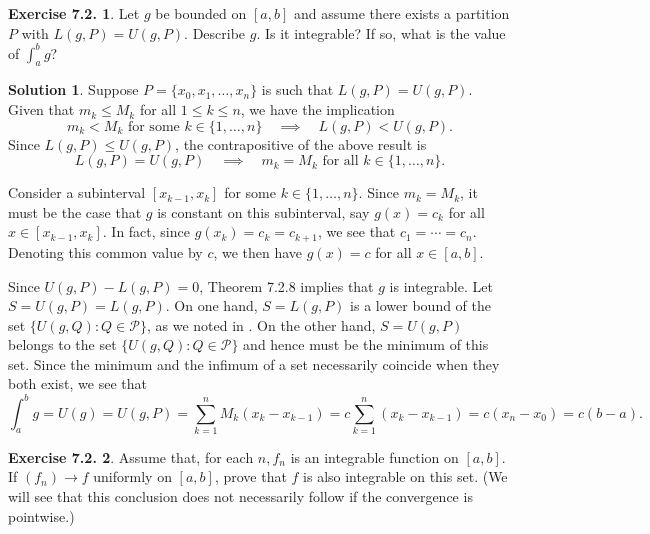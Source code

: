 \documentclass[12pt]{article}
\theoremstyle{definition}
\theoremstyle{exercise}
\newtheorem{exercise}{Exercise 7.2.}
\theoremstyle{solution}
\newtheorem*{solution}{Solution}
\newcommand{\poly}{\mathcal{P}}
\newcommand{\quimplies}{\quad \implies \quad}
\begin{document}
\begin{exercise}
\label{ex:4}
    Let \( g \) be bounded on \( [a, b] \) and assume there exists a partition \( P \) with \( L(g, P) = U(g, P) \). Describe \( g \). Is it integrable? If so, what is the value of \( \int_a^b g \)?
\end{exercise}

\begin{solution}
    Suppose \( P = \{ x_0, x_1, \ldots, x_n \} \) is such that \( L(g, P) = U(g, P) \). Given that \( m_k \leq M_k \) for all \( 1 \leq k \leq n \), we have the implication
    \[
        m_k < M_k \text{ for some } k \in \{ 1, \ldots, n \} \quimplies L(g, P) < U(g, P).
    \]
    Since \( L(g, P) \leq U(g, P) \), the contrapositive of the above result is
    \[
        L(g, P) = U(g, P) \quimplies m_k = M_k \text{ for all } k \in \{ 1, \ldots, n \}.
    \]

    Consider a subinterval \( [x_{k-1}, x_k] \) for some \( k \in \{ 1, \ldots, n \} \). Since \( m_k = M_k \), it must be the case that \( g \) is constant on this subinterval, say \( g(x) = c_k \) for all \( x \in [x_{k-1}, x_k] \). In fact, since \( g(x_k) = c_k = c_{k+1} \), we see that \( c_1 = \cdots = c_n \). Denoting this common value by \( c \), we then have \( g(x) = c \) for all \( x \in [a, b] \).
    
    Since \( U(g, P) - L(g, P) = 0 \), Theorem 7.2.8 implies that \( g \) is integrable. Let \( S = U(g, P) = L(g, P) \). On one hand, \( S = L(g, P) \) is a lower bound of the set \( \{ U(g, Q) : Q \in \poly \} \), as we noted in . On the other hand, \( S = U(g, P) \) belongs to the set \( \{ U(g, Q) : Q \in \poly \} \) and hence must be the minimum of this set. Since the minimum and the infimum of a set necessarily coincide when they both exist, we see that
    \[
        \int_a^b g = U(g) = U(g, P) = \sum_{k=1}^n M_k (x_k - x_{k-1}) = c \sum_{k=1}^n (x_k - x_{k-1}) = c (x_n - x_0) = c (b - a).
    \]
\end{solution}

\begin{exercise}
\label{ex:5}
    Assume that, for each \( n, f_n \) is an integrable function on \( [a, b] \). If \( (f_n) \to f \) uniformly on \( [a, b] \), prove that \( f \) is also integrable on this set. (We will see that this conclusion does not necessarily follow if the convergence is pointwise.)
\end{exercise}
\end{document}
